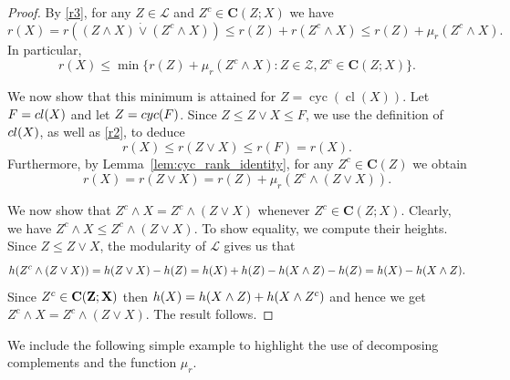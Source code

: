 \documentclass[a4paper,11pt,reqno]{article}
\theoremstyle{definition}
\newcommand{\cC}{\textup{\bf{C}}}
\DeclareMathOperator{\cyc}{cyc}
\DeclareMathOperator{\cl}{cl}
\begin{document}
\begin{proof}
    By \ref{r3}, for any $Z\in\mathcal{L}$ and $Z^c\in \mathbf{C}(Z;X)$ we have     
    $$r(X) = r((Z \wedge X) \dot\vee (Z^c \wedge X))\leq r(Z)+r(Z^c\wedge X)\leq r(Z)+\mu_r(Z^c\wedge X).$$
    In particular, 
    $$r(X) \leq \min \{ r(Z)+\mu_r(Z^c\wedge X):Z\in\mathcal{Z}, Z^c\in \mathbf{C}(Z;X)\}.$$
    
    We now show that this minimum is attained for $Z = \cyc(\cl(X))$.
    Let $F=\textup{cl}(X)$ and let $Z=\textup{cyc}(F)$. 
    Since $Z\leq Z\vee X\leq F$, we use the definition of $\textup{cl}(X)$, as well as \ref{r2}, to deduce 
    $$r(X)\leq r(Z \vee X)\leq r(F)=r(X).$$ 
    Furthermore, by Lemma~\ref{lem:cyc_rank_identity}, for any $Z^c\in\mathbf{C}(Z)$ we obtain 
    \[
      r(X)=r(Z\vee X)=r(Z)+\mu_r(Z^c\wedge(Z\vee X)).
    \]
    
    We now show that $Z^c\wedge X= Z^c\wedge(Z\vee X)$ whenever $Z^c\in \mathbf{C}(Z;X)$.
    Clearly, we have $Z^c\wedge X\leq Z^c\wedge(Z\vee X)$. To show equality, we compute their heights. Since $Z\leq Z\vee X$, the modularity of $\mathcal{L}$ gives us that
    $$\textup{h}(Z^c\wedge(Z\vee X))=\textup{h}(Z\vee X)-\textup{h}(Z)=\textup{h}(X)+\textup{h}(Z)-\textup{h}(X\wedge Z)-\textup{h}(Z)=\textup{h}(X)-\textup{h}(X\wedge Z).$$
    Since $Z^c \in \cC(Z;X)$ then $\textup{h}(X)=\textup{h}(X\wedge Z)+\textup{h}(X\wedge Z^c)$ and hence we get $Z^c\wedge X= Z^c\wedge(Z\vee X)$. The result follows.
\end{proof}

We include the following simple example to highlight the use of decomposing complements and the function $\mu_r$.
\end{document}
